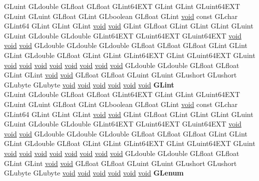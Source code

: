 \begin{DoxyCompactItemize}
\begin{tabbing}
\>GLuint GLdouble GLfloat GLfloat GLint64EXT GLint GLint GLuint64EXT GLuint GLuint GLfloat GLint GLboolean GLfloat GLint \hyperlink{interfacevoid}{void} const GLchar GLint64 GLint GLint GLint \hyperlink{interfacevoid}{void} \hyperlink{interfacevoid}{void} GLint GLfloat GLint GLint GLint GLuint GLuint GLdouble GLdouble GLint64EXT GLuint64EXT GLuint64EXT \hyperlink{interfacevoid}{void} \hyperlink{interfacevoid}{void} \hyperlink{interfacevoid}{void} GLdouble GLdouble GLdouble GLfloat GLfloat GLfloat GLint GLint GLint GLdouble GLfloat GLint GLint GLint64EXT GLint GLuint64EXT GLuint \hyperlink{interfacevoid}{void} \hyperlink{interfacevoid}{void} \hyperlink{interfacevoid}{void} \hyperlink{interfacevoid}{void} \hyperlink{interfacevoid}{void} \hyperlink{interfacevoid}{void} \hyperlink{interfacevoid}{void} \hyperlink{interfacevoid}{void} GLdouble GLdouble GLfloat GLfloat GLint GLint \hyperlink{interfacevoid}{void} \hyperlink{interfacevoid}{void} GLfloat GLfloat GLuint GLuint GLushort GLushort GLubyte GLubyte \hyperlink{interfacevoid}{void} \hyperlink{interfacevoid}{void} \hyperlink{interfacevoid}{void} \hyperlink{interfacevoid}{void} \hyperlink{interfacevoid}{void} \hyperlink{interfacevoid}{void} {\bfseries GLint}\\
\>GLuint GLdouble GLfloat GLfloat GLint64EXT GLint GLint GLuint64EXT GLuint GLuint GLfloat GLint GLboolean GLfloat GLint \hyperlink{interfacevoid}{void} const GLchar GLint64 GLint GLint GLint \hyperlink{interfacevoid}{void} \hyperlink{interfacevoid}{void} GLint GLfloat GLint GLint GLint GLuint GLuint GLdouble GLdouble GLint64EXT GLuint64EXT GLuint64EXT \hyperlink{interfacevoid}{void} \hyperlink{interfacevoid}{void} \hyperlink{interfacevoid}{void} GLdouble GLdouble GLdouble GLfloat GLfloat GLfloat GLint GLint GLint GLdouble GLfloat GLint GLint GLint64EXT GLint GLuint64EXT GLuint \hyperlink{interfacevoid}{void} \hyperlink{interfacevoid}{void} \hyperlink{interfacevoid}{void} \hyperlink{interfacevoid}{void} \hyperlink{interfacevoid}{void} \hyperlink{interfacevoid}{void} \hyperlink{interfacevoid}{void} \hyperlink{interfacevoid}{void} GLdouble GLdouble GLfloat GLfloat GLint GLint \hyperlink{interfacevoid}{void} \hyperlink{interfacevoid}{void} GLfloat GLfloat GLuint GLuint GLushort GLushort GLubyte GLubyte \hyperlink{interfacevoid}{void} \hyperlink{interfacevoid}{void} \hyperlink{interfacevoid}{void} \hyperlink{interfacevoid}{void} \hyperlink{interfacevoid}{void} \hyperlink{interfacevoid}{void} {\bfseries GLenum}\\

\end{tabbing}
\end{DoxyCompactItemize}
